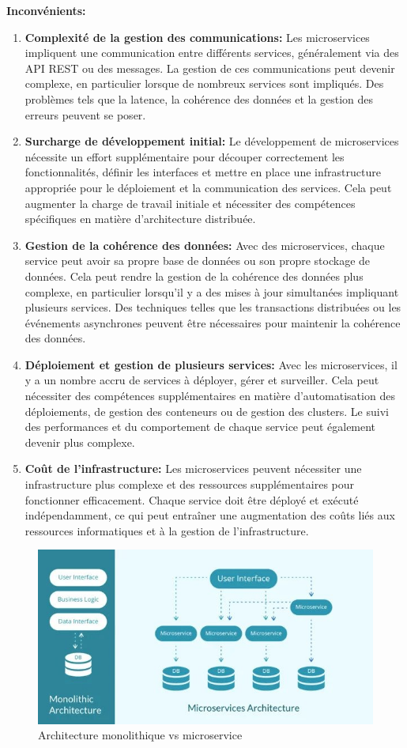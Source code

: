 \textbf{Inconvénients:}
\begin{enumerate}
    \item \textbf{Complexité de la gestion des communications:} Les microservices impliquent une communication entre différents services, généralement via des API REST ou des messages. La gestion de ces communications peut devenir complexe, en particulier lorsque de nombreux services sont impliqués. Des problèmes tels que la latence, la cohérence des données et la gestion des erreurs peuvent se poser.
    \item \textbf{Surcharge de développement initial:} Le développement de microservices nécessite un effort supplémentaire pour découper correctement les fonctionnalités, définir les interfaces et mettre en place une infrastructure appropriée pour le déploiement et la communication des services. Cela peut augmenter la charge de travail initiale et nécessiter des compétences spécifiques en matière d'architecture distribuée.
    \item \textbf{Gestion de la cohérence des données:} Avec des microservices, chaque service peut avoir sa propre base de données ou son propre stockage de données. Cela peut rendre la gestion de la cohérence des données plus complexe, en particulier lorsqu'il y a des mises à jour simultanées impliquant plusieurs services. Des techniques telles que les transactions distribuées ou les événements asynchrones peuvent être nécessaires pour maintenir la cohérence des données.
    \item \textbf{Déploiement et gestion de plusieurs services:} Avec les microservices, il y a un nombre accru de services à déployer, gérer et surveiller. Cela peut nécessiter des compétences supplémentaires en matière d'automatisation des déploiements, de gestion des conteneurs ou de gestion des clusters. Le suivi des performances et du comportement de chaque service peut également devenir plus complexe.
    \item \textbf{Coût de l'infrastructure:} Les microservices peuvent nécessiter une infrastructure plus complexe et des ressources supplémentaires pour fonctionner efficacement. Chaque service doit être déployé et exécuté indépendamment, ce qui peut entraîner une augmentation des coûts liés aux ressources informatiques et à la gestion de l'infrastructure.
\end{enumerate}

\begin{figure}[H]
\centering
\includegraphics[width=0.6\linewidth]{images/monolithicvsmicroservice.jpg}
\caption{Architecture monolithique vs microservice}\label{fig:monolithevsmicroservice}
\end{figure}

